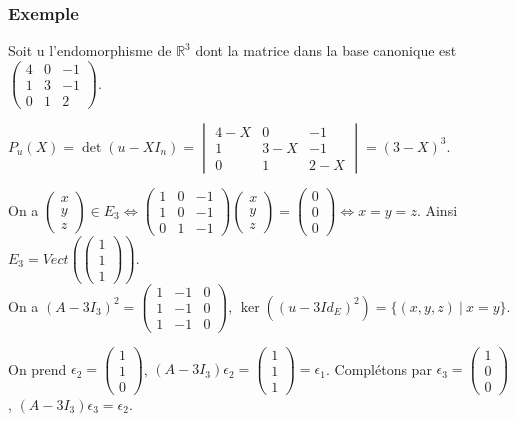 \documentclass[a4paper,10pt]{book} %
\newcommand{\R}{\mathbb{R}}
\newcommand{\tq}{~|~}
\begin{document}
\subsubsection{Exemple}
Soit u l'endomorphisme de $\R^3$ dont la matrice dans la base canonique est $\begin{pmatrix}
4&0&-1\\1&3&-1\\0&1&2
\end{pmatrix}$.

$P_u(X)=\det(u-X I_n)=\begin{vmatrix}
4-X&0&-1\\1&3-X&-1\\0&1&2-X
\end{vmatrix}=(3-X)^3$.

On a $\begin{pmatrix}x\\y\\z\end{pmatrix}\in E_3\Leftrightarrow \begin{pmatrix}
1&0&-1\\1&0&-1\\0&1&-1
\end{pmatrix}\begin{pmatrix}
x\\y\\z
\end{pmatrix}=\begin{pmatrix}
0\\0\\0
\end{pmatrix}\Leftrightarrow x=y=z$.
Ainsi $E_3=Vect(\begin{pmatrix}
1\\1\\1
\end{pmatrix})$.\\

On a $(A-3I_3)^2=\begin{pmatrix}
1&-1&0\\
1&-1&0\\
1&-1&0
\end{pmatrix}$, $\ker((u-3Id_E)^2)=\{(x,y,z)\tq x=y\}$.

On prend $\epsilon_2=\begin{pmatrix}
1\\1\\0
\end{pmatrix}$, 
$(A-3I_3)\epsilon_2=\begin{pmatrix}
1\\1\\1
\end{pmatrix}=\epsilon_1$.
Complétons par $\epsilon_3=\begin{pmatrix}
1\\0\\0
\end{pmatrix}$, $(A-3I_3)\epsilon_3=\epsilon_2$.
\end{document}
